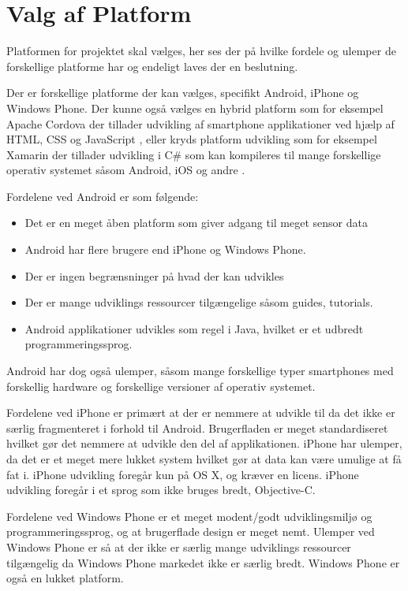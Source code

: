 \section{Valg af Platform}\label{sec:valg_af_android}
Platformen for projektet skal vælges, her ses der på hvilke fordele og ulemper de forskellige platforme har og endeligt laves der en beslutning.

Der er forskellige platforme der kan vælges, specifikt Android, iPhone og Windows Phone.
Der kunne også vælges en hybrid platform som for eksempel Apache Cordova der tillader udvikling af smartphone applikationer ved hjælp af HTML, CSS og JavaScript \citep{misc:apachecordova}, eller kryds platform udvikling som for eksempel Xamarin der tillader udvikling i C\# som kan kompileres til mange forskellige operativ systemet såsom Android, iOS og andre \citep{misc:xamarin}.

Fordelene ved Android er som følgende:
\begin{itemize}
\item Det er en meget åben platform som giver adgang til meget sensor data
\item Android har flere brugere end iPhone og Windows Phone.
\item Der er ingen begrænsninger på hvad der kan udvikles
\item Der er mange udviklings ressourcer tilgængelige såsom guides, tutorials.
\item Android applikationer udvikles som regel i Java, hvilket er et udbredt programmeringssprog.
\end{itemize}

Android har dog også ulemper, såsom mange forskellige typer smartphones med forskellig hardware og forskellige versioner af operativ systemet.

Fordelene ved iPhone er primært at der er nemmere at udvikle til da det ikke er særlig fragmenteret i forhold til Android. 
Brugerfladen er meget standardiseret hvilket gør det nemmere at udvikle den del af applikationen. 
iPhone har ulemper, da det er et meget mere lukket system hvilket gør at data kan være umulige at få fat i. iPhone udvikling foregår kun på OS X, og kræver en licens. iPhone udvikling foregår i et sprog som ikke bruges bredt, Objective-C.

Fordelene ved Windows Phone er et meget modent/godt udviklingsmiljø og programmeringssprog, og at brugerflade design er meget nemt. 
Ulemper ved Windows Phone er så at der ikke er særlig mange udviklings ressourcer tilgængelig da Windows Phone markedet ikke er særlig bredt. Windows Phone er også en lukket platform.

